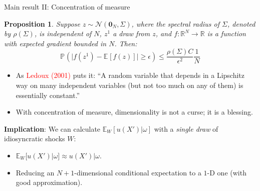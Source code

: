 \documentclass[aspectratio=169,10pt]{beamer}
\newcommand{\emphcolor}[1]{\textbf{\textcolor{emphcolorval}{#1}}}
\newtheorem{proposition}{Proposition}
\newcommand{\prob}[2][]{\ensuremath{\mathbb{P}_{#1}\left( {#2} \right)}}
\newcommand{\expec}[2][]{\ensuremath{\mathbb{E}_{{#1}}\left[ {#2} \right]}}
\begin{document}
		
		\begin{frame}[label=concentration]{Main result II: Concentration of measure}\label{Concentration}
			\begin{proposition}
				Suppose $z \sim \mathcal{N}(\mathbf{0}_N,\Sigma)$, where the spectral radius of $\Sigma$, denoted by $\rho(\Sigma)$, is independent of $N$, $z^1$ a draw from $z$, and $f:\mathbb{R}^N \rightarrow \mathbb{R}$ is a function with expected gradient bounded in $N$. Then:
				\begin{equation*}
					\prob{\big|f(z^1)-\expec{f(z)}\big|\geq \epsilon} \leq \frac{\rho(\Sigma) C}{\epsilon^2} \frac{1}{N}
				\end{equation*}
				\vspace{-0.2in}
			\end{proposition}
			\begin{itemize}
				\item As \textcolor{red}{Ledoux (2001)} puts it: ``A random variable that depends in a Lipschitz way on many independent variables (but not too much on any of them) is essentially constant.''\vspace{0.1in}
				\item With concentration of measure, dimensionality is not a curse; it is a blessing.\vspace{0.1in}
			\end{itemize}
			\emphcolor{Implication}: We can calculate $\mathbb{E}_{W}[u(X')| \omega]$ with a \textit{single draw} of idiosyncratic shocks $W$:
			\begin{itemize}
				\item $\mathbb{E}_W[u(X')|\omega]\approx u(X')|\omega$.\vspace{0.1in} 
				\item Reducing an $N+1$-dimensional conditional expectation to a $1$-D one (with good approximation). 
			\end{itemize}
\end{frame}
\end{document}
